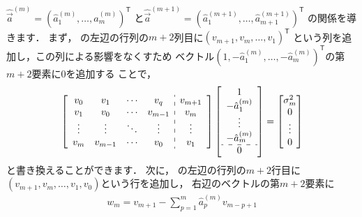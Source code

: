 $\hat{\Vec{a}}^{(m)} = (\hat{a}_1^{(m)},\ldots,\hat{a}_m^{(m)})^{\mathsf T}$
と$\hat{\Vec{a}}^{(m+1)} = (\hat{a}_1^{(m+1)},\ldots,\hat{a}_{m+1}^{(m+1)})^{\mathsf T}$
の関係を導きます．
まず，
の左辺の行列の$m+2$列目に$(v_{m+1},v_{m},\ldots,v_1)^{\mathsf T}$
という列を追加し，この列による影響をなくすため
ベクトル$(1,-\hat{a}_1^{(m)},\ldots,-\hat{a}_m^{(m)})^{\mathsf T}$の第$m+2$要素に0を追加する
ことで，
\begin{align}
\left[
\begin{array}{cccc:c}
v_{0}&v_{1}&\cdots&v_{q}&v_{m+1}\\
v_1&v_0&\cdots&v_{m-1}&v_{m}\\
\vdots&\vdots&\ddots&\vdots&\vdots\\
v_{m}&v_{m-1}&\cdots&v_{0}&v_{1}
\end{array}
\right]
\left[
\begin{array}{c}
1\\
-\hat{a}_1^{(m)}\\
\vdots\\
-\hat{a}_m^{(m)}\\
\hdashline
0
\end{array}
\right]
=
\begin{bmatrix}
\sigma_m^2\\
0\\
\vdots\\
0
\end{bmatrix}
\label{eq:LevinsonDurbin_3}
\end{align}
と書き換えることができます．
次に，
の左辺の行列の$m+2$行目に$(v_{m+1},v_{m},\ldots,v_1,v_0)$という行を追加し，
右辺のベクトルの第$m+2$要素に
\begin{align}
w_m = v_{m+1} - \sum_{p=1}^{m} \hat{a}_p^{(m)} v_{m-p+1}
\label{eq:w_P}
\end{align}

